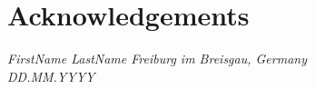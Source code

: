 \chapter*{Acknowledgements}

\Blindtext

\begin{center}
    \itshape
    FirstName LastName \hfill Freiburg im Breisgau, Germany\\
    \hfill DD.MM.YYYY
\end{center}